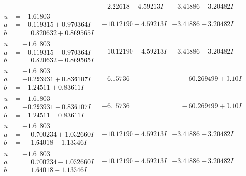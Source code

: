 \documentclass[1p]{elsarticle_modified}
\theoremstyle{definition}
\begin{document}
$$\begin{array}{c|c|c}
 & -2.22618 - 4.59213 I & -3.41886 + 3.20482 I \\ \hline\begin{aligned}
u &= -1.61803\phantom{ +0.000000I} \\
a &= -0.119315 + 0.970364 I \\
b &= \phantom{-}0.820632 + 0.869565 I\end{aligned}
 & -10.12190 - 4.59213 I & -3.41886 + 3.20482 I \\ \hline\begin{aligned}
u &= -1.61803\phantom{ +0.000000I} \\
a &= -0.119315 - 0.970364 I \\
b &= \phantom{-}0.820632 - 0.869565 I\end{aligned}
 & -10.12190 + 4.59213 I & -3.41886 - 3.20482 I \\ \hline\begin{aligned}
u &= -1.61803\phantom{ +0.000000I} \\
a &= -0.293931 + 0.836107 I \\
b &= -1.24511 + 0.83611 I\end{aligned}
 & -6.15736\phantom{ +0.000000I} & \phantom{-}                -6
0.269499 + 0. 10   I\phantom{ +0.000000I} \\ \hline\begin{aligned}
u &= -1.61803\phantom{ +0.000000I} \\
a &= -0.293931 - 0.836107 I \\
b &= -1.24511 - 0.83611 I\end{aligned}
 & -6.15736\phantom{ +0.000000I} & \phantom{-}                -6
0.269499 + 0. 10   I\phantom{ +0.000000I} \\ \hline\begin{aligned}
u &= -1.61803\phantom{ +0.000000I} \\
a &= \phantom{-}0.700234 + 1.032660 I \\
b &= \phantom{-}1.64018 + 1.13346 I\end{aligned}
 & -10.12190 + 4.59213 I & -3.41886 - 3.20482 I \\ \hline\begin{aligned}
u &= -1.61803\phantom{ +0.000000I} \\
a &= \phantom{-}0.700234 - 1.032660 I \\
b &= \phantom{-}1.64018 - 1.13346 I\end{aligned}
 & -10.12190 - 4.59213 I & -3.41886 + 3.20482 I \\ \hline\begin{aligned}

\end{aligned}
\end{array}$$
\end{document}
